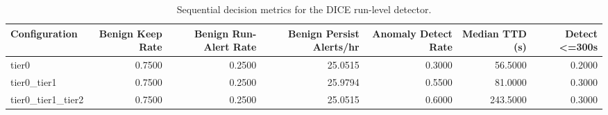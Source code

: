 \begin{table}[t]
\centering
\caption{Sequential decision metrics for the DICE run-level detector.}
\label{tab:dice_sequential_metrics}
\footnotesize
\begin{tabular}{lrrrrrr}
\toprule
Configuration & Benign Keep Rate & Benign Run-Alert Rate & Benign Persist Alerts/hr & Anomaly Detect Rate & Median TTD (s) & Detect <=300s \\
\midrule
tier0 & 0.7500 & 0.2500 & 25.0515 & 0.3000 & 56.5000 & 0.2000 \\
tier0_tier1 & 0.7500 & 0.2500 & 25.9794 & 0.5500 & 81.0000 & 0.3000 \\
tier0_tier1_tier2 & 0.7500 & 0.2500 & 25.0515 & 0.6000 & 243.5000 & 0.3000 \\
\bottomrule
\end{tabular}

\end{table}

